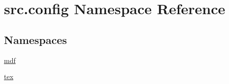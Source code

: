 \hypertarget{namespacesrc_1_1config}{\section{src.\+config Namespace Reference}
\label{namespacesrc_1_1config}
}
\subsection*{Namespaces}
\begin{DoxyCompactItemize}
\item 
 \hyperlink{namespacesrc_1_1config_1_1mdf}{mdf}
\item 
 \hyperlink{namespacesrc_1_1config_1_1tex}{tex}
\end{DoxyCompactItemize}
